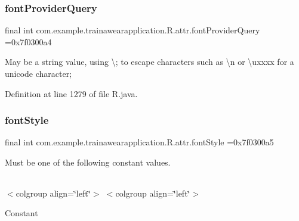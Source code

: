 \mbox{\label{classcom_1_1example_1_1trainawearapplication_1_1_r_1_1attr_a59e87c75178687392d7b92f9a0544222}} 
\subsubsection{\texorpdfstring{fontProviderQuery}{fontProviderQuery}}
{\footnotesize\ttfamily final int com.\+example.\+trainawearapplication.\+R.\+attr.\+font\+Provider\+Query =0x7f0300a4\hspace{0.3cm}{\ttfamily [static]}}

May be a string value, using \textquotesingle{}\textbackslash{};\textquotesingle{} to escape characters such as \textquotesingle{}\textbackslash{}n\textquotesingle{} or \textquotesingle{}\textbackslash{}uxxxx\textquotesingle{} for a unicode character; 

Definition at line 1279 of file R.\+java.

\mbox{\label{classcom_1_1example_1_1trainawearapplication_1_1_r_1_1attr_aba40a0b6cbd54245bd99d4534849ebab}} 
\subsubsection{\texorpdfstring{fontStyle}{fontStyle}}
{\footnotesize\ttfamily final int com.\+example.\+trainawearapplication.\+R.\+attr.\+font\+Style =0x7f0300a5\hspace{0.3cm}{\ttfamily [static]}}

Must be one of the following constant values.

\tabulinesep=1mm
\begin{longtabu}spread 0pt [c]{*{0}{|X[-1]}|}
\hline
\end{longtabu}
$<$colgroup align=\char`\"{}left\char`\"{}$>$ $<$colgroup align=\char`\"{}left\char`\"{}$>$ 

Constant

